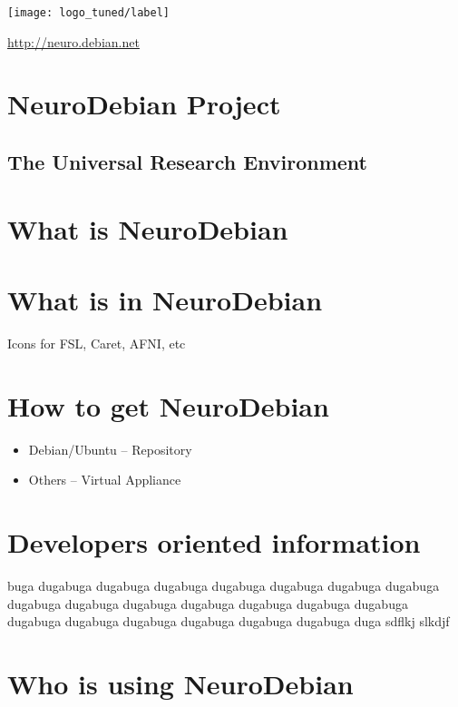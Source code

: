 \documentclass[letterpaper,landscape]{report}
\begin{document}
\pagebreak
\begin{multicols}{3}    %

\begin{center}
\noindent
\vspace{-3em}
\texttt{[image: logo\_tuned/label]}

\url{http://neuro.debian.net}
\section*{NeuroDebian Project}
\subsection*{The Universal Research Environment}


\end{center}

\section*{What is NeuroDebian}

\section*{What is in NeuroDebian}

Icons for FSL, Caret, AFNI, etc



\section*{How to get NeuroDebian}

\begin{itemize}
\item Debian/Ubuntu -- Repository
\item Others -- Virtual Appliance
\end{itemize}

\section*{Developers oriented information}

buga dugabuga dugabuga dugabuga dugabuga dugabuga dugabuga dugabuga dugabuga dugabuga dugabuga dugabuga dugabuga dugabuga dugabuga dugabuga dugabuga dugabuga dugabuga dugabuga dugabuga duga
sdflkj
slkdjf


\section*{Who is using NeuroDebian}


\end{multicols}
\end{document}
